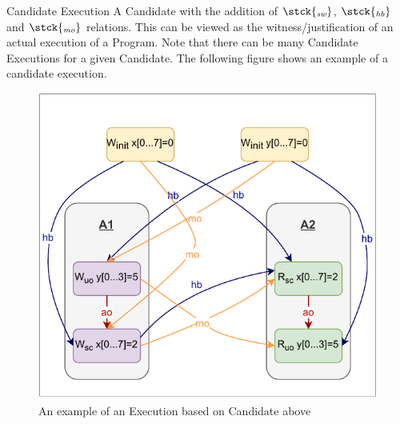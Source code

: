     
    \begin{definition}{Candidate Execution}
        A Candidate with the addition of $\stck{_\textit{sw}}$, $\stck{_\textit{hb}}$ and $\stck{_\textit{mo}}$ relations. This can be viewed as the witness/justification of an actual execution of a Program. Note that there can be many Candidate Executions for a given Candidate. The following figure shows an example of a candidate execution. 
        
        \begin{figure}[H]
            \centering
            \includegraphics[scale=0.7]{Execution.pdf}
            \caption{An example of an Execution based on Candidate above}
            \label{fig:my_label}
        \end{figure}
        
    \end{definition}
    
    
